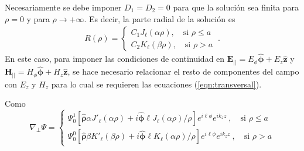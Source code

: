 Necesariamente se debe imponer $D_1 = D_2 = 0$ para que la solución sea finita para $\rho = 0$ y para $\rho \to +\infty$. Es decir, la parte radial de la solución es
\begin{align*}
 R(\rho) = 
	\left\{
	\begin{matrix}	
	C_1 J_\ell (\alpha\rho), \quad \text{si } \rho \le a  
	\\
	C_2 K_\ell (\beta\rho), \quad \text{si } \rho > a  
	\end{matrix}
	\right.
	\ . \nonumber
\end{align*}
En este caso, para imponer las condiciones de continuidad en $\textbf{E}_{||} = E_\phi \boldsymbol{\hat{\phi}} + E_z \hat{\textbf{z}}$ y $\textbf{H}_{||}= H_\phi \hat{\boldsymbol{\phi}} + H_z \hat{\textbf{z}}$, se hace necesario relacionar el resto de componentes del campo con $E_z$ y $H_z$ para lo cual se requieren las ecuaciones (\ref{eqn:transversal}). 

Como 
\begin{equation*}
	\nabla_\perp \Psi =
	\left\{	
	\begin{matrix}
		\Psi_0^1\left[\boldsymbol{\hat{\rho}}\alpha J'_\ell (\alpha \rho) + i \boldsymbol{\hat{\phi}} \ell J_\ell (\alpha \rho)/\rho\right] e^{i\ell\phi} e^{i k_z z} \ , \quad \text{si } \rho \le a  
		\\
		\Psi_0^0\left[\boldsymbol{\hat{\rho}}\beta K'_\ell (\beta\rho) +i \boldsymbol{\hat{\phi}}\ell K_\ell (\alpha \rho)/\rho \right]e^{i\ell\phi} e^{i k_z z} \ , \quad \text{si } \rho > a  
	\end{matrix}
	\right.
\end{equation*}

